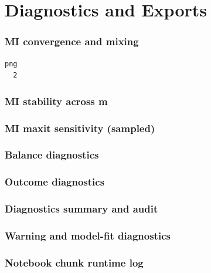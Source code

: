 \documentclass[
  11pt,
  letterpaper,
  DIV=11,
  numbers=noendperiod]{scrartcl}
\begin{document}
\section{Diagnostics and Exports}\label{diagnostics-and-exports}

\subsubsection{MI convergence and
mixing}\label{mi-convergence-and-mixing}

\begin{verbatim}
png 
  2 
\end{verbatim}

\subsubsection{MI stability across m}\label{mi-stability-across-m}

\subsubsection{MI maxit sensitivity
(sampled)}\label{mi-maxit-sensitivity-sampled}

\subsubsection{Balance diagnostics}\label{balance-diagnostics}

\subsubsection{Outcome diagnostics}\label{outcome-diagnostics}

\subsubsection{Diagnostics summary and
audit}\label{diagnostics-summary-and-audit}

\subsubsection{Warning and model-fit
diagnostics}\label{warning-and-model-fit-diagnostics}

\subsubsection{Notebook chunk runtime
log}\label{notebook-chunk-runtime-log}
\end{document}
